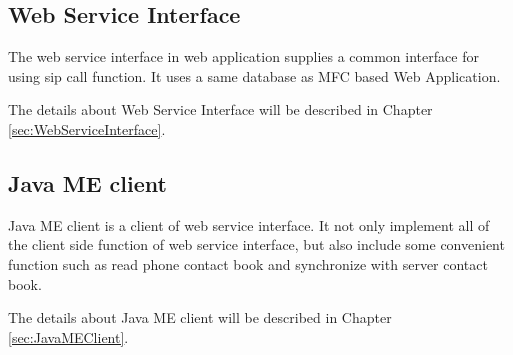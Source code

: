 \subsection{Web Service Interface}

The web service interface in web application supplies a common interface for using sip call function. It uses a same database as MFC based Web Application.

The details about Web Service Interface will be described in Chapter \ref{sec:WebServiceInterface}.

\subsection{Java ME client}

Java ME client is a client of web service interface. It not only implement all of the client side function of web service interface, but also include some convenient function such as read phone contact book and synchronize with server contact book.

The details about Java ME client will be described in Chapter \ref{sec:JavaMEClient}.







